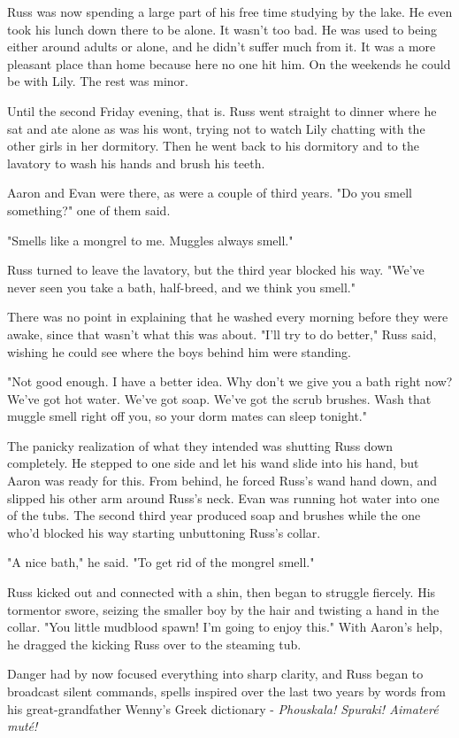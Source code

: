 \documentclass[a4paper,11pt]{article}
\begin{document}
Russ was now spending a large part of his free time studying by the lake. He even took his lunch down there to be alone. It wasn't too bad. He was used to being either around adults or alone, and he didn't suffer much from it. It was a more pleasant place than home because here no one hit him. On the weekends he could be with Lily. The rest was minor.

Until the second Friday evening, that is. Russ went straight to dinner where he sat and ate alone as was his wont, trying not to watch Lily chatting with the other girls in her dormitory. Then he went back to his dormitory and to the lavatory to wash his hands and brush his teeth.

Aaron and Evan were there, as were a couple of third years. "Do you smell something?" one of them said.

"Smells like a mongrel to me. Muggles always smell."

Russ turned to leave the lavatory, but the third year blocked his way. "We've never seen you take a bath, half-breed, and we think you smell."

There was no point in explaining that he washed every morning before they were awake, since that wasn't what this was about. "I'll try to do better," Russ said, wishing he could see where the boys behind him were standing.

"Not good enough. I have a better idea. Why don't we give you a bath right now? We've got hot water. We've got soap. We've got the scrub brushes. Wash that muggle smell right off you, so your dorm mates can sleep tonight."

The panicky realization of what they intended was shutting Russ down completely. He stepped to one side and let his wand slide into his hand, but Aaron was ready for this. From behind, he forced Russ's wand hand down, and slipped his other arm around Russ's neck. Evan was running hot water into one of the tubs. The second third year produced soap and brushes while the one who'd blocked his way starting unbuttoning Russ's collar.

"A nice bath," he said. "To get rid of the mongrel smell."

Russ kicked out and connected with a shin, then began to struggle fiercely. His tormentor swore, seizing the smaller boy by the hair and twisting a hand in the collar. "You little mudblood spawn! I'm going to enjoy this." With Aaron's help, he dragged the kicking Russ over to the steaming tub.

Danger had by now focused everything into sharp clarity, and Russ began to broadcast silent commands, spells inspired over the last two years by words from his great-grandfather Wenny's Greek dictionary - \emph{Phouskala! Spuraki! Aimateré muté!}
\end{document}
